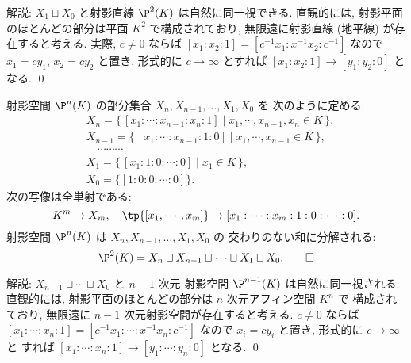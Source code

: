 \documentclass[12pt,twoside]{jarticle}
\begin{document}
\noindent
解説: $X_1\sqcup X_0$ と射影直線 $\P^2(K)$ は自然に同一視できる.
直観的には, 射影平面のほとんどの部分は平面 $K^2$ で構成されており,
無限遠に射影直線 (地平線) が存在すると考える.
実際, $c\ne 0$ ならば $[x_1:x_2:1]=[c^{-1}x_1:x^{-1}x_2:c^{-1}]$ 
なので $x_1=cy_1$, $x_2=cy_2$ と置き, 
形式的に $c\to\infty$ とすれば $[x_1:x_2:1]\to[y_1:y_2:0]$ となる.
\qed


\begin{question}[射影空間の胞体分割]
\label{q:cell-decomp-P^n}
  射影空間 $\P^n(K)$ の部分集合 $X_n,X_{n-1},\dots,X_1,X_0$ を
  次のように定める: 
  \begin{align*}
    &
    X_n = 
    \{\, [x_1:\cdots:x_{n-1}:x_n:1] \mid x_1,\cdots,x_{n-1},x_n\in K\,\},
    \\ &
    X_{n-1} = 
    \{\, [x_1:\cdots:x_{n-1}:1:0] \mid x_1,\cdots,x_{n-1}\in K\,\},
    \\ &
    \quad \cdots\cdots\cdots
    \\ &
    X_1 = \{\, [x_1:1:0:\cdots:0] \mid x_1\in K\,\},
    \\ &
    X_0 = \{ [1:0:0:\cdots:0] \}.
  \end{align*}
  次の写像は全単射である:
  \begin{equation*}
    K^m\to X_m, 
    \quad
    \tp{[x_1,\cdots,x_m]}\mapsto [x_1:\cdots:x_m:1:0:\cdots:0].
  \end{equation*}
  射影空間 $\P^n(K)$ は $X_n,X_{n-1},\dots,X_1,X_0$ の
  交わりのない和に分解される:
  \begin{equation*}
    \P^2(K) = X_n\sqcup X_{n-1}\sqcup\cdots\sqcup X_1\sqcup X_0.
    \qed
  \end{equation*}
\end{question}

\noindent
解説: $X_{n-1}\sqcup\cdots\sqcup X_0$ と $n-1$ 次元
射影空間 $\P^{n-1}(K)$ は自然に同一視される.
直観的には, 射影平面のほとんどの部分は $n$ 次元アフィン空間 $K^n$ で
構成されており,  無限遠に $n-1$ 次元射影空間が存在すると考える.
$c\ne 0$ ならば $[x_1:\cdots:x_n:1]=[c^{-1}x_1:\cdots:x^{-1}x_n:c^{-1}]$ 
なので $x_i=cy_i$ と置き, 形式的に $c\to\infty$ と
すれば $[x_1:\cdots:x_n:1]\to[y_1:\cdots:y_n:0]$ となる.
\qed

\medskip
\end{document}
